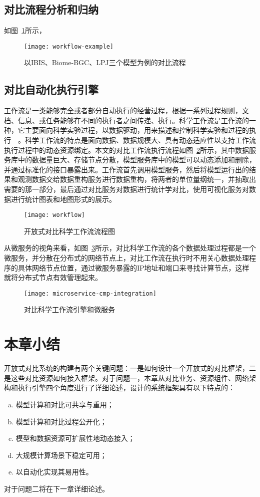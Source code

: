 \subsection{对比流程分析和归纳}
如图~\ref{fig:workflow-example}所示，

\begin{figure}[!htbp]
    \centering
    \texttt{[image: workflow-example]}
    \caption{以IBIS、Biome-BGC、LPJ三个模型为例的对比流程}
    \label{fig:workflow-example}
\end{figure}

\subsection{对比自动化执行引擎}
工作流是一类能够完全或者部分自动执行的经营过程，根据一系列过程规则，文档、信息、或任务能够在不同的执行者之间传递、执行。科学工作流是工作流的一种，它主要面向科学实验过程，以数据驱动，用来描述和控制科学实验和过程的执行~\cite{ludascher2006scientific}~\cite{Zhao2009Special}。科学工作流的特点是面向数据、数据规模大、具有动态适应性以支持工作流执行过程中的动态资源绑定。本文的对比工作流执行流程如图~\ref{fig:workflow}所示，其中数据服务库中的数据量巨大、存储节点分散，模型服务库中的模型可以动态添加和删除，并通过标准化的接口暴露出来。工作流首先调用模型服务，然后将模型运行出的结果和观测数据交给数据重构服务进行数据重构，将两者的单位量纲统一，并抽取出需要的那一部分，最后通过对比服务对数据进行统计学对比，使用可视化服务对数据进行统计图表和地图形式的展示。

\begin{figure}[!htbp]
    \centering
    \texttt{[image: workflow]}
    \caption{开放式对比科学工作流流程图}
    \label{fig:workflow}
\end{figure}

从微服务的视角来看，如图~\ref{fig:microservice-cmp-integration}所示，对比科学工作流的各个数据处理过程都是一个微服务，并分散在分布式的网络节点上，对比工作流在执行时不用关心数据处理程序的具体网络节点位置，通过微服务暴露的IP地址和端口来寻找计算节点，这样就将分布式节点有效管理起来。

\begin{figure}[!htbp]
    \centering
    \texttt{[image: microservice-cmp-integration]}
    \caption{对比科学工作流引擎和微服务}
    \label{fig:microservice-cmp-integration}
\end{figure}


\section{本章小结}
开放式对比系统的构建有两个关键问题：一是如何设计一个开放式的对比框架，二是这些对比资源如何接入框架。对于问题一，本章从对比业务、资源组件、网络架构和执行引擎四个角度进行了详细论述，设计的系统框架具有以下特点的：

\begin{enumerate}[(a)]
    \item 模型计算和对比可共享与重用；
    \item 模型计算和对比过程公开化；
    \item 模型和数据资源可扩展性地动态接入；
    \item 大规模计算场景下稳定可用；
    \item 以自动化实现其易用性。
\end{enumerate} 

对于问题二将在下一章详细论述。